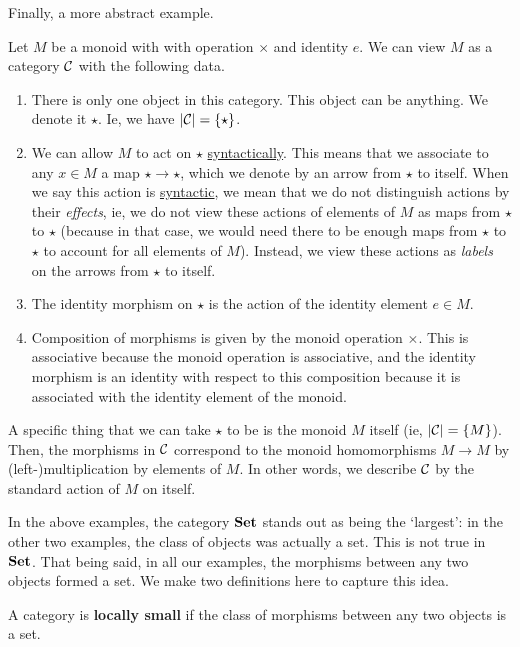 Finally, a more abstract example.

\begin{boxexample}[Monoids]\label{Ch1:Eg:Monoids} %
    Let $M$ be a monoid with with operation $\times$ and identity $e$. We can view $M$ as a category $\mathcal{C}$ with the following data.
    \begin{enumerate}
        \item There is only one object in this category. This object can be anything. We denote it $\star$. Ie, we have $\left\lvert \mathcal{C} \right\rvert = \left\{ \star \right\}$.
        \item We can allow $M$ to act on $\star$ \underline{syntactically}. This means that we associate to any $x \in M$ a map $\star \to \star$, which we denote by an arrow from $\star$ to itself. When we say this action is \underline{syntactic}, we mean that we do not distinguish actions by their \textit{effects}, ie, we do not view these actions of elements of $M$ as maps from $\star$ to $\star$ (because in that case, we would need there to be enough maps from $\star$ to $\star$ to account for all elements of $M$). Instead, we view these actions as \textit{labels} on the arrows from $\star$ to itself.
        \item The identity morphism on $\star$ is the action of the identity element $e \in M$.
        \item Composition of morphisms is given by the monoid operation $\times$. This is associative because the monoid operation is associative, and the identity morphism is an identity with respect to this composition because it is associated with the identity element of the monoid.
    \end{enumerate}
    A specific thing that we can take $\star$ to be is the monoid $M$ itself (ie, $\left\lvert \mathcal{C} \right\rvert = \left\{ M \right\}$). Then, the morphisms in $\mathcal{C}$ correspond to the monoid homomorphisms $M \to M$ by (left-)multiplication by elements of $M$. In other words, we describe $\mathcal{C}$ by the standard action of $M$ on itself.
\end{boxexample}

In the above examples, the category $\mathbf{Set}$ stands out as being the `largest': in the other two examples, the class of objects was actually a set. This is not true in $\mathbf{Set}$. That being said, in all our examples, the morphisms between any two objects formed a set. We make two definitions here to capture this idea.

\begin{boxdefinition}
    A category is \textbf{locally small} if the class of morphisms between any two objects is a set.
\end{boxdefinition}

